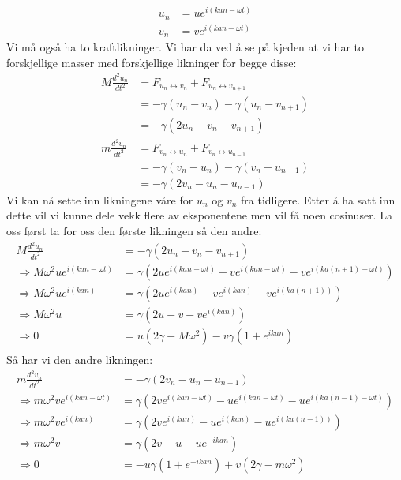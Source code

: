 \documentclass{article}
\begin{document}
\begin{align}
    \label{eq:diatomisk_kjede_ansatz}
    u_n &= u e^{i (kan - \omega t)} \\
    v_n &= v e^{i (kan - \omega t)}
\end{align}
Vi må også ha to kraftlikninger. Vi har da ved å se på kjeden at vi har to forskjellige masser med forskjellige likninger for begge disse:
\begin{align*}
    M \frac{d^2 u_n}{dt^2} &= F_{u_n \leftrightarrow v_n} + F_{u_n \leftrightarrow v_{n+1}}\\
                           &= -\gamma( u_n - v_n) -\gamma( u_n - v_{n+1}) \\
                           &= -\gamma(2u_n - v_{n} - v_{n+1}) \\
    m \frac{d^2 v_n}{dt^2} &= F_{v_n \leftrightarrow u_n} + F_{v_n \leftrightarrow u_{n-1}}\\
                           &= -\gamma( v_n - u_n) -\gamma( v_n - u_{n-1}) \\
                           &= -\gamma(2v_n - u_{n} - u_{n-1})
\end{align*}
Vi kan nå sette inn likningene våre for $u_n$ og $v_n$ fra tidligere. Etter å ha satt inn dette vil vi kunne dele vekk flere av eksponentene men vil få noen cosinuser. La oss først ta for oss den første likningen så den andre:
\begin{align*}
    M \frac{d^2 u_n}{dt^2} &= -\gamma(2u_n - v_{n} - v_{n+1})\\
    \Rightarrow M \omega^2 u e^{i(kan - \omega t)} &= \gamma\left(2 u e^{i(kan - \omega t)} - v e^{i(kan - \omega t)} - v e^{i(ka(n+1) - \omega t)}\right) \\
    \Rightarrow M \omega^2 u e^{i(kan)} &= \gamma\left(2 u e^{i(kan)} - v e^{i(kan)} - v e^{i(ka(n+1))}\right) \\
    \Rightarrow M \omega^2 u  &= \gamma\left(2 u - v  - v e^{i(kan)}\right) \\
    \Rightarrow 0 &= u (2 \gamma - M \omega^2) - v \gamma (1 + e^{i kan}) \\
\end{align*}
Så har vi den andre likningen:
\begin{align*}
    m \frac{d^2 v_n}{dt^2} &= -\gamma(2v_n - u_{n} - u_{n-1})\\
\Rightarrow m \omega^2 v e^{i(kan - \omega t)} &= \gamma\left(2 v e^{i(kan - \omega t)} - u e^{i(kan - \omega t)} - u e^{i(ka(n-1) - \omega t)}\right) \\
\Rightarrow m \omega^2 v e^{i(kan)} &= \gamma\left(2 v e^{i(kan)} - u e^{i(kan)} - u e^{i(ka(n-1))}\right) \\
\Rightarrow m \omega^2 v &= \gamma ( 2v - u - u e^{-ikan})\\
\Rightarrow 0 &= -u \gamma(1 + e^{-ikan}) + v (2\gamma - m \omega^2 )  
\end{align*}
\end{document}

